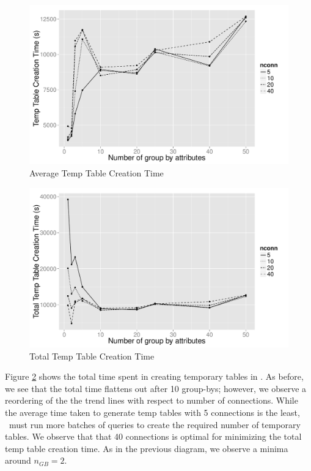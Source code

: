 
\begin{figure}[h]
  \centering
    \includegraphics[width=12cm]{Images/mult_gb_tt_creation_single.pdf} 
  \caption{Average Temp Table Creation Time} 
    \label{fig:avg_tt_creation}
\end{figure}

\begin{figure}[h]
  \centering
    \includegraphics[width=12cm]{Images/mult_gb_tt_creation_total.pdf}
  \caption{Total Temp Table Creation Time} 
    \label{fig:total_tt_creation_time}
\end{figure}

Figure \ref{fig:total_tt_creation_time} shows the total time spent in creating
temporary tables in \SeeDB. As before, we see that the total time
flattens out after 10 group-bys; however, we observe a reordering of the the
trend lines with respect to number of connections. While the average time taken
to generate temp tables with 5 connections is the least, \SeeDB\ must run more
batches of queries to create the required number of temporary tables. We observe
that that 40 connections is optimal for minimizing the total temp table creation
time. As in the previous diagram, we observe a minima around $n_{GB}=2$.

